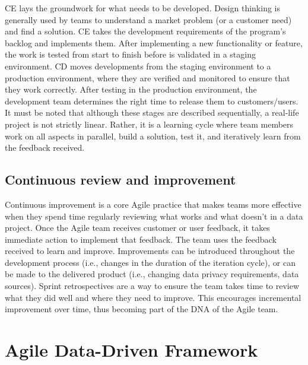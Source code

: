 \documentclass[
  letterpaper,
  DIV=11,
  numbers=noendperiod]{scrreprt}
\begin{document}
CE lays the groundwork for what needs to be developed. Design thinking
is generally used by teams to understand a market problem (or a customer
need) and find a solution. CE takes the development requirements of the
program's backlog and implements them. After implementing a new
functionality or feature, the work is tested from start to finish before
is validated in a staging environment. CD moves developments from the
staging environment to a production environment, where they are verified
and monitored to ensure that they work correctly. After testing in the
production environment, the development team determines the right time
to release them to customers/users. It must be noted that although these
stages are described sequentially, a real-life project is not strictly
linear. Rather, it is a learning cycle where team members work on all
aspects in parallel, build a solution, test it, and iteratively learn
from the feedback received.

\hypertarget{continuous-review-and-improvement}{%
\subsection{Continuous review and
improvement}\label{continuous-review-and-improvement}}

Continuous improvement is a core Agile practice that makes teams more
effective when they spend time regularly reviewing what works and what
doesn't in a data project. Once the Agile team receives customer or user
feedback, it takes immediate action to implement that feedback. The team
uses the feedback received to learn and improve. Improvements can be
introduced throughout the development process (i.e., changes in the
duration of the iteration cycle), or can be made to the delivered
product (i.e., changing data privacy requirements, data sources). Sprint
retrospectives are a way to ensure the team takes time to review what
they did well and where they need to improve. This encourages
incremental improvement over time, thus becoming part of the DNA of the
Agile team.

\hypertarget{agile-data-driven-framework}{%
\section{Agile Data-Driven
Framework}\label{agile-data-driven-framework}}
\end{document}
